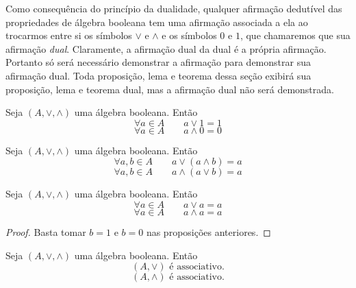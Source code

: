 	Como consequência do princípio da dualidade, qualquer afirmação dedutível das propriedades de álgebra booleana tem uma afirmação associada a ela ao trocarmos entre si os símbolos $ \vee $ e $\wedge$ e os símbolos $0$ e $1$, que chamaremos que sua afirmação \emph{dual}. Claramente, a afirmação dual da dual é a própria afirmação. Portanto só será necessário demonstrar a afirmação para demonstrar sua afirmação dual. Toda proposição, lema e teorema dessa seção exibirá sua proposição, lema e teorema dual, mas a afirmação dual não será demonstrada.

\begin{theorem}[Identidades]
	Seja $(A, \vee ,\wedge)$ uma álgebra booleana. Então
	\begin{equation*}
	\forall a \in A \qquad a \vee 1=1
	\end{equation*}
	\begin{equation*}
	\forall a \in A \qquad a \wedge 0 = 0
	\end{equation*}
\end{theorem}

\begin{theorem}[Absorção]
	Seja $(A, \vee ,\wedge)$ uma álgebra booleana. Então
	\begin{equation*}
	\forall a,b \in A \qquad a \vee (a \wedge b)=a
	\end{equation*}
	\begin{equation*}
	\forall a,b \in A \qquad a \wedge (a  \vee  b) = a
	\end{equation*}
\end{theorem}

\begin{coro}[Idempotência]
	Seja $(A, \vee ,\wedge)$ uma álgebra booleana. Então
	\begin{equation*}
	\forall a \in A \qquad a \vee a=a
	\end{equation*}
	\begin{equation*}
	\forall a \in A \qquad a \wedge a = a
	\end{equation*}
\end{coro}
\begin{proof}
	Basta tomar $b=1$ e $b=0$ nas proposições anteriores.
\end{proof}

\begin{theorem}[Associatividade]
	Seja $(A, \vee ,\wedge)$ uma álgebra booleana. Então
	\begin{equation*}
	(A, \vee ) \text{ é associativo.}
	\end{equation*}
	\begin{equation*}
	(A,\wedge) \text{ é associativo.}
	\end{equation*}
\end{theorem}

